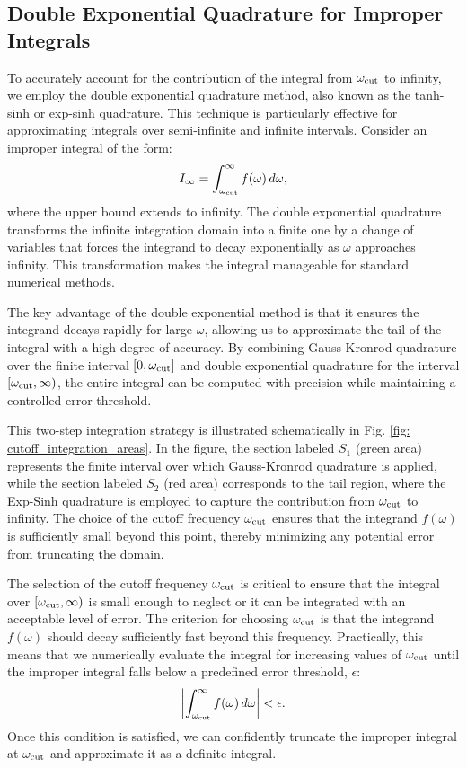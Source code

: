 \subsection{Double Exponential Quadrature for Improper Integrals}

To accurately account for the contribution of the integral from $\omega_{\rm cut}$ to infinity, we employ the double exponential quadrature method, also known as the tanh-sinh or exp-sinh quadrature. This technique is particularly effective for approximating integrals over semi-infinite and infinite intervals. Consider an improper integral of the form:
\begin{equation}
    I_{\infty} = \int_{\omega_{\rm cut}}^{\infty} f(\omega)\, d\omega,
\end{equation}
where the upper bound extends to infinity. The double exponential quadrature transforms the infinite integration domain into a finite one by a change of variables that forces the integrand to decay exponentially as $\omega$ approaches infinity. This transformation makes the integral manageable for standard numerical methods.

The key advantage of the double exponential method is that it ensures the integrand decays rapidly for large $\omega$, allowing us to approximate the tail of the integral with a high degree of accuracy. By combining Gauss-Kronrod quadrature over the finite interval $[0, \omega_{\rm cut}]$ and double exponential quadrature for the interval $[\omega_{\rm cut}, \infty)$, the entire integral can be computed with precision while maintaining a controlled error threshold.

This two-step integration strategy is illustrated schematically in Fig. \ref{fig: cutoff_integration_areas}. In the figure, the section labeled \(S_1\) (green area) represents the finite interval over which Gauss-Kronrod quadrature is applied, while the section labeled \(S_2\) (red area) corresponds to the tail region, where the Exp-Sinh quadrature is employed to capture the contribution from $\omega_{\rm cut}$ to infinity. The choice of the cutoff frequency $\omega_{\rm cut}$ ensures that the integrand \(f(\omega)\) is sufficiently small beyond this point, thereby minimizing any potential error from truncating the domain.

The selection of the cutoff frequency $\omega_{\rm cut}$ is critical to ensure that the integral over $[\omega_{\rm cut}, \infty)$ is small enough to neglect or it can be integrated with an acceptable level of error. The criterion for choosing $\omega_{\rm cut}$ is that the integrand $f(\omega)$ should decay sufficiently fast beyond this frequency. Practically, this means that we numerically evaluate the integral for increasing values of $\omega_{\rm cut}$ until the improper integral falls below a predefined error threshold, $\epsilon$:
\begin{equation}
    \left| \int_{\omega_{\rm cut}}^{\infty} f(\omega)\, d\omega \right| < \epsilon.
\end{equation}
Once this condition is satisfied, we can confidently truncate the improper integral at $\omega_{\rm cut}$ and approximate it as a definite integral.

